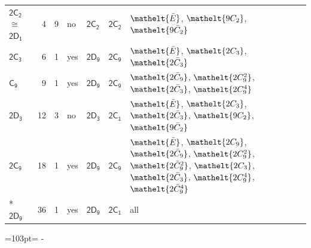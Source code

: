 \documentclass[10pt,a4paper]{article}
\newcommand{\needspace}[1]{\par\penalty-100\begingroup\dimen0=#1\relax\dimen2=\pagegoal
  \advance\dimen2-\pagetotal\ifdim\dimen0>\dimen2\relax\ifdim\dimen2>0pt\vfil\break\fi\fi
  \endgroup}
\numberwithin{equation}{section}
\newcommand{\eltfont}[1]{{\let\sigma\eltsigma\mathelt{#1}}}
\newcommand{\grp}[1]{\mathsf{#1}}
\newcommand{\cls}[1]{\eltfont{#1}}
\newcommand{\samecls}{\cong}
\newcommand{\barred}[1]{\bar{#1}}
\newlength{\fillwidth}\newlength{\cellwidth}\newlength{\colwidth}
\begin{document}
{\begin{longtable}{@{}lrrlll>{\RaggedRight\arraybackslash}p{\fillwidth}@{}}
\href{2C2.pdf}{$\grp{2C_{2}}$} $\samecls$ \href{2D1.pdf}{$\grp{2D_{1}}$} & 4 & 9 & no & \href{2C2.pdf}{$\grp{2C_{2}}$} & \href{2C2.pdf}{$\grp{2C_{2}}$} & $\cls{\barred{E}}$, $\cls{9C_{2}}$, $\cls{9\barred{C}_{2}}$\\
\href{2C3.pdf}{$\grp{2C_{3}}$} & 6 & 1 & yes & \href{2D9.pdf}{$\grp{2D_{9}}$} & \href{2C9.pdf}{$\grp{2C_{9}}$} & $\cls{\barred{E}}$, $\cls{2C_{3}}$, $\cls{2\barred{C}_{3}}$\\
\href{C9.pdf}{$\grp{C_{9}}$} & 9 & 1 & yes & \href{2D9.pdf}{$\grp{2D_{9}}$} & \href{2C9.pdf}{$\grp{2C_{9}}$} & $\cls{2\barred{C}_{9}}$, $\cls{2C_{9}^{2}}$, $\cls{2\barred{C}_{3}}$, $\cls{2C_{9}^{4}}$\\
\href{2D3.pdf}{$\grp{2D_{3}}$} & 12 & 3 & no & \href{2D3.pdf}{$\grp{2D_{3}}$} & \href{2C1.pdf}{$\grp{2C_{1}}$} & $\cls{\barred{E}}$, $\cls{2C_{3}}$, $\cls{2\barred{C}_{3}}$, $\cls{9C_{2}}$, $\cls{9\barred{C}_{2}}$\\
\href{2C9.pdf}{$\grp{2C_{9}}$} & 18 & 1 & yes & \href{2D9.pdf}{$\grp{2D_{9}}$} & \href{2C9.pdf}{$\grp{2C_{9}}$} & $\cls{\barred{E}}$, $\cls{2C_{9}}$, $\cls{2\barred{C}_{9}}$, $\cls{2C_{9}^{2}}$, $\cls{2\barred{C}_{9}^{2}}$, $\cls{2C_{3}}$, $\cls{2\barred{C}_{3}}$, $\cls{2C_{9}^{4}}$, $\cls{2\barred{C}_{9}^{4}}$\\*
\href{2D9.pdf}{$\grp{2D_{9}}$} & 36 & 1 & yes & \href{2D9.pdf}{$\grp{2D_{9}}$} & \href{2C1.pdf}{$\grp{2C_{1}}$} & all\\
\bottomrule\end{longtable}}
\needspace{103pt}
\end{document}
